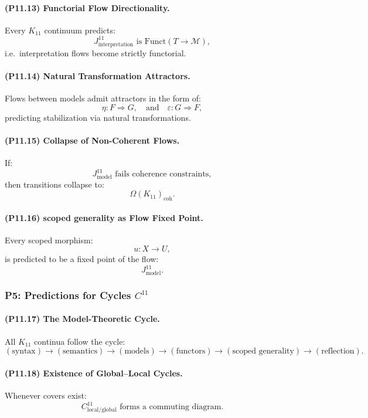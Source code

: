 \paragraph{(P11.13) Functorial Flow Directionality.}
Every $K_{11}$ continuum predicts:
\[
J_{\mathrm{interpretation}}^{11}
\text{ is } \mathrm{Funct}(T \to \mathcal{M}),
\]
i.e.\ interpretation flows become strictly functorial.

\paragraph{(P11.14) Natural Transformation Attractors.}
Flows between models admit attractors in the form of:
\[
\eta: F \Rightarrow G,
\quad\text{and}\quad
\varepsilon: G \Rightarrow F,
\]
predicting stabilization via natural transformations.

\paragraph{(P11.15) Collapse of Non-Coherent Flows.}
If:
\[
J_{\mathrm{model}}^{11}
\text{ fails coherence constraints},
\]
then transitions collapse to:
\[
\Omega(K_{11})_{\mathrm{coh}}.
\]

\paragraph{(P11.16) scoped generality as Flow Fixed Point.}
Every scoped morphism:
\[
u: X \to U,
\]
is predicted to be a fixed point of the flow:
\[
J_{\mathrm{model}}^{11}.
\]

\subsubsection{P5: Predictions for Cycles $C^{11}$}

\paragraph{(P11.17) The Model-Theoretic Cycle.}
All $K_{11}$ continua follow the cycle:
\[
(\text{syntax}) \to (\text{semantics})
\to (\text{models}) \to (\text{functors})
\to (\text{scoped generality}) \to (\text{reflection}).
\]

\paragraph{(P11.18) Existence of Global–Local Cycles.}
Whenever covers exist:
\[
C_{\mathrm{local/global}}^{11}
\text{ forms a commuting diagram.}
\]

